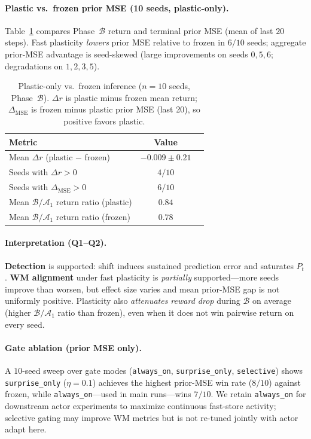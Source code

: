 \paragraph{Plastic vs.\ frozen prior MSE (10 seeds, plastic-only).}
Table~\ref{tab:plastic-act} compares Phase~$\mathcal{B}$ return and terminal prior MSE (mean of last $20$ steps).
Fast plasticity \emph{lowers} prior MSE relative to frozen in $6/10$ seeds; aggregate prior-MSE advantage is seed-skewed (large improvements on seeds $0,5,6$; degradations on $1,2,3,5$).

\begin{table}[t]
  \centering
  \caption{Plastic-only vs.\ frozen inference ($n{=}10$ seeds, Phase~$\mathcal{B}$). $\Delta r$ is plastic minus frozen mean return; $\Delta_{\mathrm{MSE}}$ is frozen minus plastic prior MSE (last 20), so positive favors plastic.}
  \label{tab:plastic-act}
  \begin{tabular}{@{}lcc@{}}
    \toprule
    Metric & Value \\
    \midrule
    Mean $\Delta r$ (plastic $-$ frozen) & $-0.009 \pm 0.21$ \\
    Seeds with $\Delta r > 0$ & $4/10$ \\
    Seeds with $\Delta_{\mathrm{MSE}} > 0$ & $6/10$ \\
    Mean $\mathcal{B}/\mathcal{A}_1$ return ratio (plastic) & $0.84$ \\
    Mean $\mathcal{B}/\mathcal{A}_1$ return ratio (frozen) & $0.78$ \\
  \end{tabular}
\end{table}

\paragraph{Interpretation (Q1--Q2).}
\textbf{Detection} is supported: shift induces sustained prediction error and saturates $P_t$.
\textbf{WM alignment} under fast plasticity is \emph{partially} supported---more seeds improve than worsen, but effect size varies and mean prior-MSE gap is not uniformly positive.
Plasticity also \emph{attenuates reward drop} during $\mathcal{B}$ on average (higher $\mathcal{B}/\mathcal{A}_1$ ratio than frozen), even when it does not win pairwise return on every seed.

\paragraph{Gate ablation (prior MSE only).}
A $10$-seed sweep over gate modes (\texttt{always\_on}, \texttt{surprise\_only}, \texttt{selective}) shows \texttt{surprise\_only} ($\eta=0.1$) achieves the highest prior-MSE win rate ($8/10$) against frozen, while \texttt{always\_on}---used in main runs---wins $7/10$.
We retain \texttt{always\_on} for downstream actor experiments to maximize continuous fast-store activity; selective gating may improve WM metrics but is not re-tuned jointly with actor adapt here.


